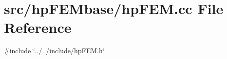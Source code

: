 \section{src/hp\+F\+E\+Mbase/hp\+F\+EM.cc File Reference}
\label{hp_f_e_m_8cc}
{\ttfamily \#include \char`\"{}../../include/hp\+F\+E\+M.\+h\char`\"{}}\newline
